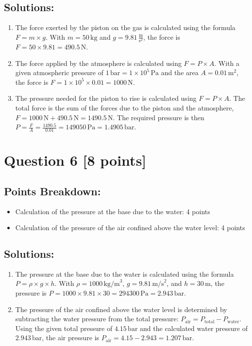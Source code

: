 \documentclass[12pt]{article}
\begin{document}
\subsection*{Solutions:}
\begin{enumerate}
    \item The force exerted by the piston on the gas is calculated using the formula \( F = m \times g \). With \( m = 50 \, \text{kg} \) and \( g = 9.81 \, \frac{\text{m}}{\text{s}^2} \), the force is \( F = 50 \times 9.81 = 490.5 \, \text{N} \).
    \item The force applied by the atmosphere is calculated using \( F = P \times A \). With a given atmospheric pressure of \( 1 \, \text{bar} = 1 \times 10^5 \, \text{Pa} \) and the area \( A = 0.01 \, \text{m}^2 \), the force is \( F = 1 \times 10^5 \times 0.01 = 1000 \, \text{N} \).
    \item The pressure needed for the piston to rise is calculated using \( F = P \times A \). The total force is the sum of the forces due to the piston and the atmosphere, \( F = 1000 \, \text{N} + 490.5 \, \text{N} = 1490.5 \, \text{N} \). The required pressure is then \( P = \frac{F}{A} = \frac{1490.5}{0.01} = 149050 \, \text{Pa} = 1.4905 \, \text{bar} \).
\end{enumerate}

\newpage
\section*{Question 6 [8 points]}
\subsection*{Points Breakdown:}
\begin{itemize}
    \item Calculation of the pressure at the base due to the water: 4 points
    \item Calculation of the pressure of the air confined above the water level: 4 points
\end{itemize}

\subsection*{Solutions:}
\begin{enumerate}
    \item The pressure at the base due to the water is calculated using the formula \( P = \rho \times g \times h \). With \( \rho = 1000 \, \text{kg/m}^3 \), \( g = 9.81 \, \text{m/s}^2 \), and \( h = 30 \, \text{m} \), the pressure is \( P = 1000 \times 9.81 \times 30 = 294300 \, \text{Pa} = 2.943 \, \text{bar} \).
    \item The pressure of the air confined above the water level is determined by subtracting the water pressure from the total pressure: \( P_{\text{air}} = P_{\text{total}} - P_{\text{water}} \). Using the given total pressure of \( 4.15 \, \text{bar} \) and the calculated water pressure of \( 2.943 \, \text{bar} \), the air pressure is \( P_{\text{air}} = 4.15 - 2.943 = 1.207 \, \text{bar} \).
\end{enumerate}
\end{document}
